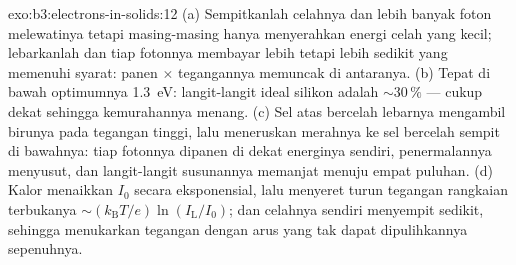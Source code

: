 \begin{solution}{exo:b3:electrons-in-solids:12}
(a) Sempitkanlah celahnya dan lebih banyak foton melewatinya tetapi
masing-masing hanya menyerahkan energi celah yang kecil; lebarkanlah dan tiap
fotonnya membayar lebih tetapi lebih sedikit yang memenuhi syarat: panen
$\times$ tegangannya memuncak di antaranya.
(b) Tepat di bawah optimumnya \qty{1.3}{eV}: langit-langit ideal
silikon adalah $\sim30\,\%$ --- cukup dekat sehingga kemurahannya menang.
(c) Sel atas bercelah lebarnya mengambil birunya pada tegangan tinggi, lalu
meneruskan merahnya ke sel bercelah sempit di bawahnya: tiap fotonnya dipanen
di dekat energinya sendiri, penermalannya menyusut, dan langit-langit
susunannya memanjat menuju empat puluhan. (d) Kalor menaikkan $I_0$
secara eksponensial, lalu menyeret turun tegangan rangkaian terbukanya
$\sim(k_{\text{B}}T/e)\ln(I_{\text{L}}/I_0)$; dan celahnya sendiri
menyempit sedikit, sehingga menukarkan tegangan dengan arus yang tak
dapat dipulihkannya sepenuhnya.
\end{solution}


